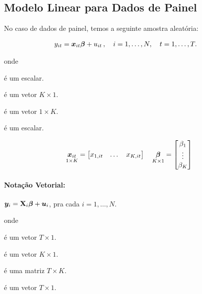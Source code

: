 \documentclass[11pt, oneside, a4paper, article]{article}
\numberwithin{equation}{section}
\begin{document}
\subsection{Modelo Linear para Dados de Painel}

No caso de dados de painel, temos a seguinte amostra aleatória:

\vspace{-1 em}
\begin{align}\label{pols:mod}
y_{it} &= \boldsymbol{x}_{it} \boldsymbol{\beta} + u_{it} \, , \quad i=1, \dots, N, \quad t=1, \dots, T.
\end{align}

\noindent onde
\vspace{-1 ex}
\begin{description}[noitemsep]
	\item[$y_{it}$] é um escalar.
	\item[$\betavec$] é um vetor $K \times 1$.
	\item[$\xvec_{it}$] é um vetor $1 \times K$.
	\item[$u_{it}$] é um escalar.
\end{description}

\vspace{-2 em}
\begin{align*}
\underset{1 \times K}{\boldsymbol{x}_{it}} = 
\begin{bmatrix}
x_{1,it} & \dots & x_{K, it}
\end{bmatrix}
\quad
\underset{K \times 1}{\boldsymbol{\beta}} = 
\begin{bmatrix}
\beta_{1} \\ \vdots \\ \beta_{K}
\end{bmatrix}
\end{align*}

\paragraph{Notação Vetorial:}
$\boldsymbol{y}_{i} = \mathbf{X}_{i} \boldsymbol{\beta} + \boldsymbol{u}_{i}$,  pra cada $i=1, \dots, N$.

\noindent onde
\vspace{-1 ex}
\begin{description}[noitemsep]
	\item[$\yvec_{i}$] é um vetor $T \times 1$.
	\item[$\betavec$] é um vetor $K \times 1$.
	\item[$\Xmat_{i}$] é uma matriz $T \times K$.
	\item[$\uvec_{it}$] é um vetor $T \times 1$.
\end{description}
\end{document}
